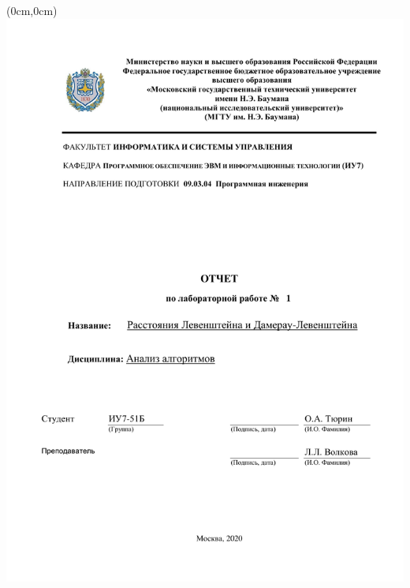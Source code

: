 \documentclass[12pt,a4paper]{article}
\begin{document}
	\begin{titlepage}
		\begin{textblock*}{13cm}(0cm,0cm)
			\includegraphics{reportTitle}
		\end{textblock*}
	\end{titlepage}
\hspace{0pt}
\clearpage
\tableofcontents
\clearpage
\end{document}
